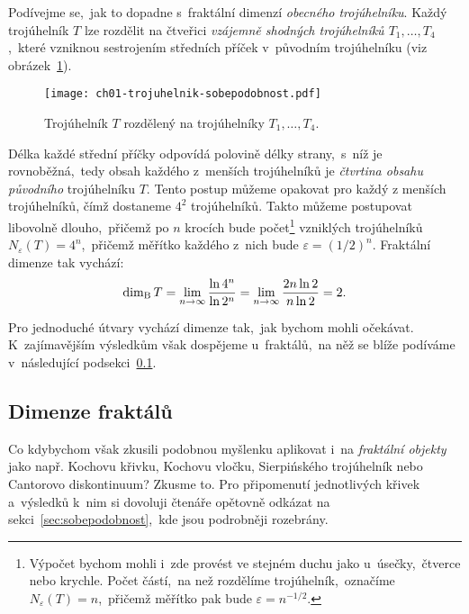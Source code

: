 \begin{example}\label{ex:fraktalni-dimenze-trojuhelnik}
    Podívejme se,~jak to dopadne s~fraktální dimenzí \emph{obecného trojúhelníku}. Každý trojúhelník $T$ lze rozdělit na čtveřici \emph{vzájemně shodných trojúhelníků $T_1,\dots,T_4$},~které vzniknou sestrojením středních příček v~původním trojúhelníku (viz obrázek~\ref{fig:trojuhelnik-sobepodobnost}).
    \begin{figure}[h]
        \centering
        \texttt{[image: ch01-trojuhelnik-sobepodobnost.pdf]}
        \caption{Trojúhelník $T$ rozdělený na trojúhelníky $T_1,\dots,T_4$.}
        \label{fig:trojuhelnik-sobepodobnost}
    \end{figure}
    Délka každé střední příčky odpovídá polovině délky strany,~s~níž je rovnoběžná,~tedy obsah každého z~menších trojúhelníků je \emph{čtvrtina obsahu původního} trojúhelníku $T$. Tento postup můžeme opakovat pro každý z menších trojúhelníků, čímž dostaneme $4^2$ trojúhelníků. Takto můžeme postupovat libovolně dlouho,~přičemž po $n$ krocích bude počet\footnote{Výpočet bychom mohli i~zde provést ve stejném duchu jako u~úsečky,~čtverce nebo krychle. Počet částí,~na než rozdělíme trojúhelník,~označíme $N_\varepsilon(T)=n$,~přičemž měřítko pak bude $\varepsilon=n^{-1/2}$.} vzniklých trojúhelníků $N_\varepsilon(T)=4^n$,~přičemž měřítko každého z~nich bude $\varepsilon=(1/2)^n$. Fraktální dimenze tak vychází:
    \[\operatorname{dim_B}{T}=\lim_{n\to\infty}{\dfrac{\ln{4^n}}{\ln{2^n}}}=\lim_{n\to\infty}{\dfrac{2n\ln{2}}{n\ln{2}}}=2.\]
\end{example}
Pro jednoduché útvary vychází dimenze tak,~jak bychom mohli očekávat. K~zajímavějším výsledkům však dospějeme u~fraktálů,~na něž se blíže podíváme v~následující podsekci~\ref{subsec:dimenze-fraktalu}.

\subsection{Dimenze fraktálů}\label{subsec:dimenze-fraktalu}

Co kdybychom však zkusili podobnou myšlenku aplikovat i~na \emph{fraktální objekty} jako např. Kochovu křivku, Kochovu vločku, Sierpińského trojúhelník nebo Cantorovo diskontinuum? Zkusme to. Pro připomenutí jednotlivých křivek a~výsledků k~nim si dovoluji čtenáře opětovně odkázat na sekci~\ref{sec:sobepodobnost},~kde jsou podrobněji rozebrány.

